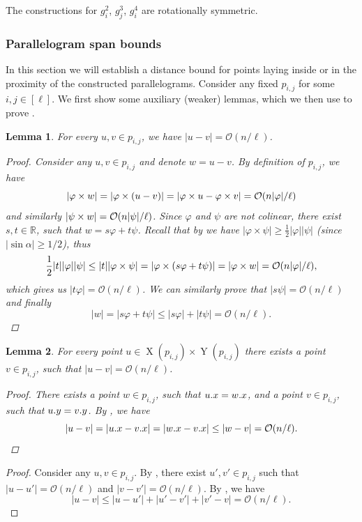\documentclass[11pt, letterpaper]{article}
\theoremstyle{plain}
\newtheorem{lemma}{Lemma}
\theoremstyle{definition}
\theoremstyle{remark}
\renewcommand{\O}{\mathcal{O}}
\renewcommand{\phi}{\varphi}
\DeclareMathOperator*{\X}{X}
\DeclareMathOperator*{\Y}{Y}
\begin{document}
The constructions for $g^2_i$, $g^3_j$, $g^4_i$ are rotationally symmetric.


\subsubsection{Parallelogram span bounds} \label{distance_bound_lemma_proof}

In this section we will establish a distance bound for points laying inside or in the proximity of the constructed parallelograms.
Consider any fixed $p_{i, j}$ for some $i, j \in [\ell]$.
We first show some auxiliary (weaker) lemmas, which we then use to prove .

\begin{lemma}\label{distance_bound_aux}
	For every $u, v \in p_{i, j}$, we have $|u - v| = \O(n / \ell)$.
	\begin{proof}
		Consider any $u, v \in p_{i, j}$ and denote $w = u - v$.
		By definition of $p_{i, j}$, we have
		\[ |\h{w}| = |\h{(u - v)}| = |\h{u} - \h{v}| = \O(n|\phi| / \ell) \]
		and similarly $|\s{w}| = \O(n|\psi| / \ell)$.
		Since $\phi$ and $\psi$ are not colinear, there exist $s, t \in \mathbb{R}$, such that $w = s\phi + t\psi$.
		Recall that by  we have $|\phi \times \psi| \ge \frac{1}{2}|\phi||\psi|$ (since $|\sin \alpha| \ge 1/2$), thus
		\[ \frac{1}{2}|t||\phi||\psi| \le |t||\phi \times \psi| = |\phi \times (s\phi + t\psi)| = |\h{w}| = \O(n|\phi| / \ell), \]
		which gives us $|t\phi| = \O(n / \ell)$.
		We can similarly prove that $|s\psi| = \O(n / \ell)$ and finally
		\[ |w| = |s\phi + t\psi| \le |s\phi| + |t\psi| = \O(n / \ell). \]
	\end{proof}
\end{lemma}

\begin{lemma}\label{distance_bound_aux2}
	For every point $u \in \X(p_{i, j}) \times \Y(p_{i, j})$ there exists a point $v \in p_{i, j}$, such that $|u - v| = \O(n / \ell)$.
	\begin{proof}
		There exists a point $w \in p_{i, j}$, such that $u.x = w.x$, and a point $v \in p_{i, j}$, such that $u.y = v.y$.
		By , we have
		\[|u - v| = |\x{u} - \x{v}| = |\x{w} - \x{v}| \le |w - v| = \O(n / \ell).\] 
	\end{proof}
\end{lemma}

\DistanceBoundLemma
\begin{proof}
	Consider any $u, v \in p_{i, j}$.
	By , there exist $u', v' \in p_{i, j}$ such that $|u - u'| = \O(n / \ell)$ and $|v - v'| = \O(n / \ell)$.
	By , we have
	\[ |u - v| \le |u - u'| + |u' - v'| + |v' - v| = \O(n / \ell). \]
\end{proof}
\end{document}

